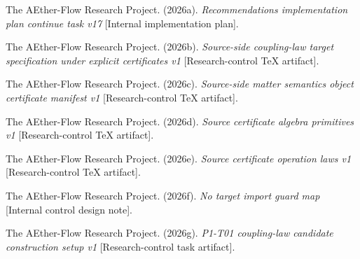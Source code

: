 \documentclass[11pt]{article}
\begin{document}
The AEther-Flow Research Project. (2026a). \emph{Recommendations
implementation plan continue task v17} [Internal implementation plan].

The AEther-Flow Research Project. (2026b). \emph{Source-side coupling-law
target specification under explicit certificates v1} [Research-control TeX
artifact].

The AEther-Flow Research Project. (2026c). \emph{Source-side matter semantics
object certificate manifest v1} [Research-control TeX artifact].

The AEther-Flow Research Project. (2026d). \emph{Source certificate algebra
primitives v1} [Research-control TeX artifact].

The AEther-Flow Research Project. (2026e). \emph{Source certificate operation
laws v1} [Research-control TeX artifact].

The AEther-Flow Research Project. (2026f). \emph{No target import guard map}
[Internal control design note].

The AEther-Flow Research Project. (2026g). \emph{P1-T01 coupling-law candidate
construction setup v1} [Research-control task artifact].
\end{document}
